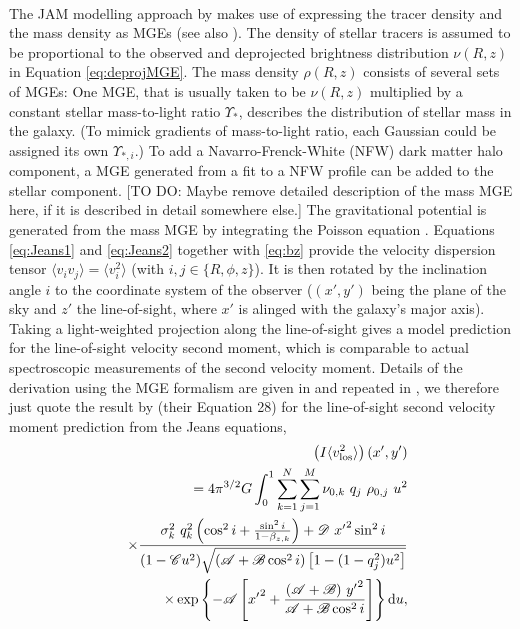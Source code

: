 \\The JAM modelling approach by \citet{Cap08} makes use of expressing the tracer density and the mass density as MGEs (see also \citet{1994A&A...285..723E}). The density of stellar tracers is assumed to be proportional to the observed and deprojected brightness distribution $\nu(R,z)$ in Equation \ref{eq:deprojMGE}. The mass density $\rho(R,z)$ consists of several sets of MGEs: One MGE, that is usually taken to be $\nu(R,z)$ multiplied by a constant stellar mass-to-light ratio $\Upsilon_*$, describes the distribution of stellar mass in the galaxy. (To mimick gradients of mass-to-light ratio, each Gaussian could be assigned its own $\Upsilon_{*,i}$.) To add a Navarro-Frenck-White (NFW) \citep{Navarro+1995c,NFW96} dark matter halo component, a MGE generated from a fit to a NFW profile can be added to the stellar component. [TO DO: Maybe remove detailed description of the mass MGE here, if it is described in detail somewhere else.] The gravitational potential is generated from the mass MGE by integrating the Poisson equation \citep{1994A&A...285..723E}. Equations \ref{eq:Jeans1} and \ref{eq:Jeans2} together with \ref{eq:bz} provide the velocity dispersion tensor $\langle v_i v_j \rangle = \langle v_i^2 \rangle$ (with $i,j \in \{ R,\phi, z\}$). It is then rotated by the inclination angle $i$ to the coordinate system of the observer ($(x',y')$ being the plane of the sky and $z'$ the line-of-sight, where $x'$ is alinged with the galaxy's major axis). Taking a light-weighted projection along the line-of-sight gives a model prediction for the line-of-sight velocity second moment, which is comparable to actual spectroscopic measurements of the second velocity moment. Details of the derivation using the MGE formalism are given in \citet{Cap08} and repeated in \citet{GlennEC}, we therefore just quote the result by \citet{Cap08} (their Equation 28) for the line-of-sight second velocity moment prediction from the Jeans equations,
\begin{eqnarray}
&&\left(I \langle v_\text{los}^2\rangle\right)(x',y')\nonumber\\
&&= 4 \pi^{3/2} G \int_0^1 \sum_{k=1}^N \sum_{j=1}^M \nu_{0,k} \ q_j \ \rho_{0,j} \ u^2\nonumber\\
&& \times \frac{\sigma_k^2 \ q^{2}_k \left( \cos^2 i + \frac{\sin^2 i}{1-\beta_{z,k}}\right) + \mathscr{D} \  {x'}^{2} \sin^2 i}{(1-\mathscr{C}u^2) \sqrt{(\mathscr{A} + \mathscr{B} \cos^2 i) \left[1-(1-q^{2}_j) u^2 \right]}}\nonumber\\
&& \times \exp\left\{- \mathscr{A} \left[{x'}^{2} + \frac{(\mathscr{A}+\mathscr{B}) \ {y'}^{2}}{\mathscr{A}+\mathscr{B}\cos^2 i}\right] \right\} \diff u, \label{eq:explicitLOSvelCap}
\end{eqnarray}

